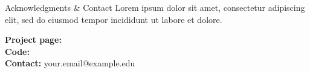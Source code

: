 \begin{block}{Acknowledgments \& Contact}
Lorem ipsum dolor sit amet, consectetur adipiscing elit, sed do eiusmod tempor incididunt ut labore et dolore.

\vspace{0.4em}
\textbf{Project page:} \\[0.2em]
\textbf{Code:} \\[0.2em]
\textbf{Contact:} your.email@example.edu
\end{block}
